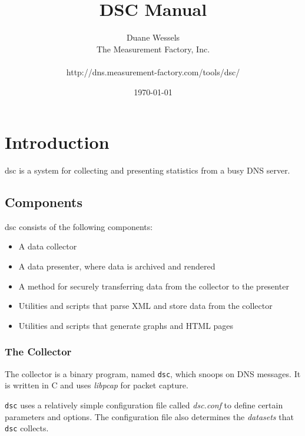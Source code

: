 \documentclass{report}
\def\dsc{{\sc dsc}}
\begin{document}
\begin{titlepage}
\title{DSC Manual}
\author{Duane Wessels\\
The Measurement Factory, Inc.\\
\\
http://dns.measurement-factory.com/tools/dsc/}
\date{\today}
\end{titlepage}

\maketitle
\tableofcontents

\chapter{Introduction}

{\dsc} is a system for collecting and presenting statistics from
a busy DNS server.  

\section{Components}

{\dsc} consists of the following components:
\begin{itemize}
\item A data collector
\item A data presenter, where data is archived and rendered
\item A method for securely transferring data from the collector
	to the presenter
\item Utilities and scripts that parse XML and store data from the collector
\item Utilities and scripts that generate graphs and HTML pages
\end{itemize}

\subsection{The Collector}

The collector is a binary program, named {\tt dsc\/}, which snoops
on DNS messages.  It is written in C and uses {\em libpcap\/} for
packet capture.

{\tt dsc\/} uses a relatively simple configuration file called {\em
dsc.conf\/} to define certain parameters and options.  The configuration
file also determines the {\em datasets\/} that {\tt dsc\/} collects.
\end{document}
